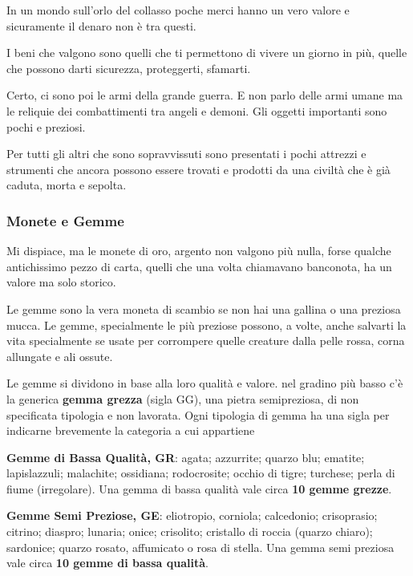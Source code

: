 \documentclass[12pt,a4paper,twoside,openany]{book}
\begin{document}
\begin{multicols}{2}
	
\label{ricchezza-e-denaro}

In un mondo sull'orlo del collasso poche merci hanno un vero valore e sicuramente il denaro non è tra questi.

I beni che valgono sono quelli che ti permettono di vivere un giorno in più, quelle che possono darti sicurezza, proteggerti, sfamarti.

Certo, ci sono poi le armi della grande guerra. E non parlo delle armi umane ma le reliquie dei combattimenti tra angeli e demoni. Gli oggetti importanti sono pochi e preziosi.

Per tutti gli altri che sono sopravvissuti sono presentati i pochi attrezzi e strumenti che ancora possono essere trovati e prodotti da una civiltà che è già caduta, morta e sepolta.

\subsubsection{Monete e Gemme}

Mi dispiace, ma le monete di oro, argento non valgono più nulla, forse qualche antichissimo pezzo di carta, quelli che una volta chiamavano banconota, ha un valore ma solo storico.

Le gemme sono la vera moneta di scambio se non hai una gallina o una preziosa mucca. Le gemme, specialmente le più preziose possono, a volte, anche salvarti la vita specialmente se usate per corrompere quelle creature dalla pelle rossa, corna allungate e ali ossute.

Le gemme si dividono in base alla loro qualità e valore. nel gradino più basso c'è la generica \textbf{gemma grezza} (sigla GG), una pietra semipreziosa, di non specificata tipologia e non lavorata. Ogni tipologia di gemma ha una sigla per indicarne brevemente la categoria a cui appartiene

\textbf{Gemme di Bassa Qualità, GR}: agata; azzurrite; quarzo blu; ematite; lapislazzuli; malachite; ossidiana; rodocrosite; occhio di tigre; turchese; perla di fiume (irregolare). Una gemma di bassa qualità vale circa \textbf{10 gemme grezze}.


\textbf{Gemme Semi Preziose, GE}: eliotropio, corniola; calcedonio; crisoprasio; citrino; diaspro; lunaria; onice; crisolito; cristallo di roccia (quarzo chiaro); sardonice; quarzo rosato, affumicato o rosa di stella. Una gemma semi preziosa vale circa \textbf{10 gemme di bassa qualità}.


\end{multicols}
\end{document}
